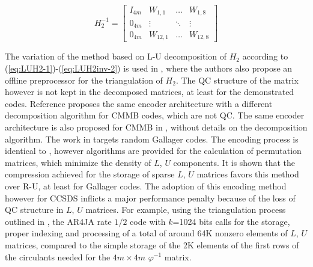     \begin{equation}
        H_{2}^{-1}=
        \begin{bmatrix}
            I_{4m} & W_{1,1} & \dots  & W_{1,8} \\
            0_{4m} & \vdots  & \ddots & \vdots \\
            0_{4m} & W_{12,1} & \dots  & W_{12,8}
        \end{bmatrix}
        \label{eq:H2InvStruct}                  
    \end{equation}\par
The variation of the method based on L-U decomposition of $H_{2}$ according to (\ref{eq:LUH2-1})-(\ref{eq:LUH2inv-2}) is used in \cite{Jia-ningSu2005}, where the authors also propose an offline preprocessor for the triangulation of $H_{2}$. The QC structure of the matrix however is not kept in the decomposed matrices, at least for the demonstrated codes. Reference \cite{XiangranSun2011} proposes the same encoder architecture with a different decomposition algorithm for CMMB codes, which are not QC. The same encoder architecture is also proposed for CMMB in \cite{Wang2008}, without details on the decomposition algorithm. The work in \cite{Kaji2006} targets random Gallager codes. The encoding process is identical to \cite{Jia-ningSu2005}, however algorithms are provided for the calculation of permutation matrices, which minimize the density of $L$, $U$ components. It is shown that the compression achieved for the storage of sparse $L$, $U$ matrices favors this method over R-U, at least for Gallager codes. The adoption of this encoding method however for CCSDS inflicts a major performance penalty because of the loss of QC structure in $L$, $U$ matrices. For example, using the triangulation process outlined in \cite{Jia-ningSu2005}, the AR4JA rate $1/2$ code with $k$=1024 bits calls for the storage, proper indexing and processing of a total of around 64K nonzero elements of $L$, $U$ matrices, compared to the simple storage of the 2K elements of the first rows of the circulants needed for the $4m \times 4m$ $\varphi^{-1}$ matrix.\par               
